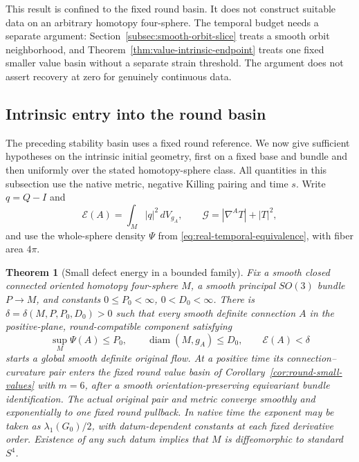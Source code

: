 \documentclass[11pt]{article}
\numberwithin{equation}{section}
\newtheorem{theorem}{Theorem}[section]
\theoremstyle{definition}
\theoremstyle{remark}
\begin{document}
This result is confined to the fixed round basin.
It does not construct suitable data on an arbitrary
homotopy four-sphere. The temporal budget needs a separate
argument: Section~\ref{subsec:smooth-orbit-slice} treats a
smooth orbit neighborhood, and
Theorem~\ref{thm:value-intrinsic-endpoint} treats one fixed
smaller value basin without a separate strain threshold. The argument
does not assert recovery at zero for genuinely
continuous data.

\subsection{Intrinsic entry into the round basin}
\label{subsec:intrinsic-round-entry}

The preceding stability basin uses a fixed round reference.
We now give sufficient hypotheses on the intrinsic initial
geometry, first on a fixed base and bundle and then uniformly
over the stated homotopy-sphere class. All quantities in
this subsection use the native metric, negative Killing pairing
and time $s$. Write $q=Q-I$ and
\[
 \mathscr E(A)=\int_M|q|^2\,dV_{g_A},\qquad
 \mathcal G=|\nabla^AT|+|T|^2,
\]
and use the whole-sphere density $\Psi$ from
\eqref{eq:real-temporal-equivalence}, with fiber area $4\pi$.

\begin{theorem}[Small defect energy in a bounded family]
\label{thm:compact-family-energy-entry}
Fix a smooth closed connected oriented homotopy four-sphere
$M$, a smooth principal $SO(3)$ bundle $P\to M$, and constants
$0\le P_0<\infty$, $0<D_0<\infty$.
There is $\delta=\delta(M,P,P_0,D_0)>0$ such that every smooth
definite connection $A$ in the positive-plane, round-compatible
component satisfying
\begin{equation}\label{eq:compact-energy-entry-hypotheses}
 \sup_M\Psi(A)\le P_0,\qquad
 \operatorname{diam}(M,g_A)\le D_0,\qquad
 \mathscr E(A)<\delta
\end{equation}
starts a global smooth definite original flow.
At a positive time its connection--curvature pair enters the
fixed round value basin of Corollary~\ref{cor:round-small-values}
with $m=6$, after a smooth orientation-preserving equivariant bundle
identification. The actual original pair and metric converge
smoothly and exponentially to one fixed round pullback.
In native time the exponent may be taken as
$\lambda_1(G_0)/2$, with datum-dependent constants at each
fixed derivative order. Existence of any such datum implies
that $M$ is diffeomorphic to standard $S^4$.
\end{theorem}
\end{document}
